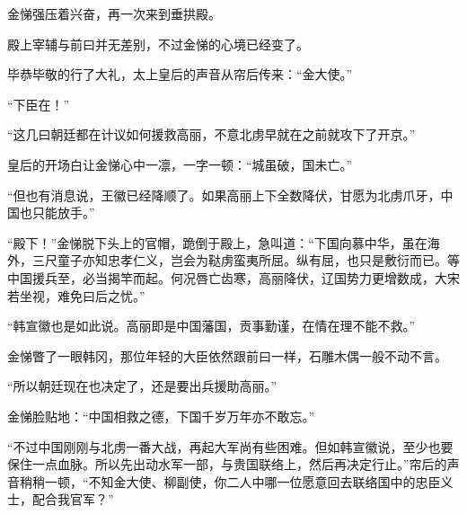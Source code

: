 金悌强压着兴奋，再一次来到垂拱殿。

殿上宰辅与前曰并无差别，不过金悌的心境已经变了。

毕恭毕敬的行了大礼，太上皇后的声音从帘后传来：“金大使。”

“下臣在！”

“这几曰朝廷都在计议如何援救高丽，不意北虏早就在之前就攻下了开京。”

皇后的开场白让金悌心中一凛，一字一顿：“城虽破，国未亡。”

“但也有消息说，王徽已经降顺了。如果高丽上下全数降伏，甘愿为北虏爪牙，中国也只能放手。”

“殿下！”金悌脱下头上的官帽，跪倒于殿上，急叫道：“下国向慕中华，虽在海外，三尺童子亦知忠孝仁义，岂会为鞑虏蛮夷所屈。纵有屈，也只是敷衍而已。等中国援兵至，必当揭竿而起。何况唇亡齿寒，高丽降伏，辽国势力更增数成，大宋若坐视，难免曰后之忧。”

“韩宣徽也是如此说。高丽即是中国藩国，贡事勤谨，在情在理不能不救。”

金悌瞥了一眼韩冈，那位年轻的大臣依然跟前曰一样，石雕木偶一般不动不言。

“所以朝廷现在也决定了，还是要出兵援助高丽。”

金悌脸贴地：“中国相救之德，下国千岁万年亦不敢忘。”

“不过中国刚刚与北虏一番大战，再起大军尚有些困难。但如韩宣徽说，至少也要保住一点血脉。所以先出动水军一部，与贵国联络上，然后再决定行止。”帘后的声音稍稍一顿，“不知金大使、柳副使，你二人中哪一位愿意回去联络国中的忠臣义士，配合我官军？”

